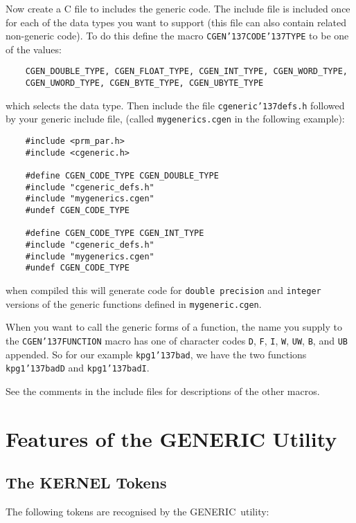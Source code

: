 \documentclass[twoside,11pt]{article}
\renewcommand{\_}{{\tt\char'137}}     %
\newcommand{\GENERIC}{{\footnotesize GENERIC}\normalsize}
\begin{document}
Now create a C file to includes the generic code. The include file is included
once for each of the data types you want to support (this file can also
contain related non-generic code).  To do this define the macro
{\tt CGEN\_CODE\_TYPE} to be one of the values:

\begin{verbatim}
    CGEN_DOUBLE_TYPE, CGEN_FLOAT_TYPE, CGEN_INT_TYPE, CGEN_WORD_TYPE, 
    CGEN_UWORD_TYPE, CGEN_BYTE_TYPE, CGEN_UBYTE_TYPE
\end{verbatim}

which selects the data type. Then include the file {\tt cgeneric\_defs.h}
followed by your generic include file, (called {\tt mygenerics.cgen} in the
following example):

\begin{verbatim}
    #include <prm_par.h>
    #include <cgeneric.h>

    #define CGEN_CODE_TYPE CGEN_DOUBLE_TYPE
    #include "cgeneric_defs.h"
    #include "mygenerics.cgen"
    #undef CGEN_CODE_TYPE

    #define CGEN_CODE_TYPE CGEN_INT_TYPE
    #include "cgeneric_defs.h"
    #include "mygenerics.cgen"
    #undef CGEN_CODE_TYPE
\end{verbatim}

when compiled this will generate code for {\tt double precision}
and {\tt integer} versions of the generic functions defined in
{\tt mygeneric.cgen}.

When you want to call the generic forms of a function, the name you supply to
the {\tt CGEN\_FUNCTION} macro has one of character codes {\tt D}, {\tt F},
{\tt I}, {\tt W}, {\tt UW},  {\tt B}, and {\tt UB} appended.  So for our
example {\tt kpg1\_bad}, we have the two functions {\tt kpg1\_badD} and
{\tt kpg1\_badI}.

See the comments in the include files for descriptions of the other macros.

\section{Features of the GENERIC Utility}

\subsection{The KERNEL Tokens}

The following tokens are recognised by the \GENERIC\ utility:

\newlength{\numlen}
\settowidth{\numlen}{000000000000}
\settowidth{\labelsep}{000}
\end{document}

